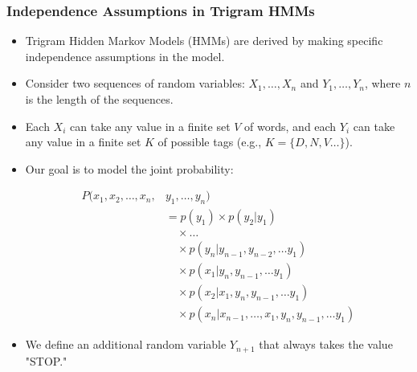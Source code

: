 \documentclass[handout]{beamer}
\begin{document}
\begin{frame}
\frametitle{Independence Assumptions in Trigram HMMs}
\scriptsize

\begin{itemize}
    \item Trigram Hidden Markov Models (HMMs) are derived by making specific independence assumptions in the model.
    
    \item Consider two sequences of random variables: $X_1, \ldots, X_n$ and $Y_1, \ldots, Y_n$, where $n$ is the length of the sequences.
    
    \item Each $X_i$ can take any value in a finite set $V$ of words, and each $Y_i$ can take any value in a finite set $K$ of possible tags (e.g., $K=\{D,N,V\dots \}$).
    
    \item Our goal is to model the joint probability:

    \begin{align*}
  P(x_1,x_2,\dots,x_n,&y_1,\dots,y_n) \\
  &= p(y_1) \times p(y_2|y_1) \\
  &\quad \times \dots \\
  &\quad \times p(y_n|y_{n-1},y_{n-2},\dots y_1) \\
  &\quad \times p(x_1|y_{n},y_{n-1},\dots y_1) \\
  &\quad \times p(x_2|x_1,y_{n},y_{n-1},\dots y_1) \\
  &\quad \times p(x_n|x_{n-1},\dots,x_1,y_{n},y_{n-1},\dots y_1)
  \end{align*}

    
    \item We define an additional random variable $Y_{n+1}$ that always takes the value "STOP."




    
\end{itemize}

\end{frame}
\end{document}
